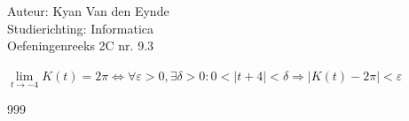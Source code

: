 \documentclass[a4paper]{article}
\begin{document}
  
\noindent \large Auteur: Kyan Van den Eynde \\
\noindent \large Studierichting: Informatica\\
\noindent \large Oefeningenreeks 2C nr. 9.3\\

\medskip

\normalsize

$\lim\limits_{t \rightarrow -4} K(t) = 2\pi \Leftrightarrow \forall \varepsilon > 0, \exists \delta > 0 : 0 < |t+4| < \delta \Rightarrow |K(t) - 2\pi| < \varepsilon$

\begin{thebibliography}{999}
\end{thebibliography}
\end{document}
